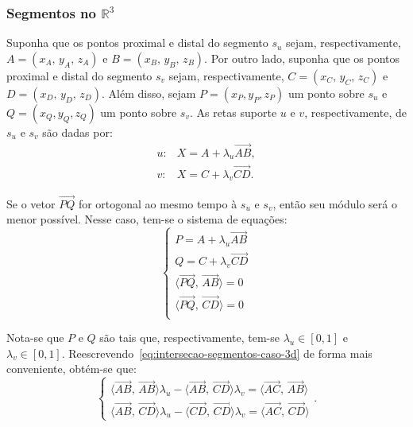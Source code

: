 \subsubsection{Segmentos no $\mathbb{R}^3$}\label{subsec:intersecao-3d}

Suponha que os pontos proximal e distal do segmento $s_u$ sejam, respectivamente, 
$A = (x_A,\, y_A,\, z_A)$ e $B = (x_B,\, y_B,\, z_B)$. 
Por outro lado, suponha que os pontos proximal e distal do segmento $s_v$ sejam, respectivamente, 
$C = (x_C,\, y_C,\, z_C)$ e $D = (x_D,\, y_D,\, z_D)$. Além disso, 
sejam $P = (x_P, y_P, z_P)$ um ponto sobre $s_u$ e 
$Q = (x_Q, y_Q, z_Q)$ um ponto sobre $s_v$. As retas suporte $u$ e $v$, 
respectivamente, de $s_u$ e $s_v$ são dadas por:
\begin{eqnarray}
  u: & X = A + \lambda_u\overrightarrow{AB}\label{eq:reta-suporte-do-segmento-su-3d}, \\
  v: & X = C + \lambda_v\overrightarrow{CD}\label{eq:reta-suporte-do-segmento-sv-3d}.
\end{eqnarray}

Se o vetor $\overrightarrow{PQ}$ for ortogonal ao mesmo tempo à $s_u$ e $s_v$, então seu módulo
será o menor possível. Nesse caso, tem-se o sistema de equações:
\begin{equation}
  \begin{cases}
    P = A + \lambda_u\overrightarrow{AB}\\
    Q = C + \lambda_v\overrightarrow{CD}\\
    \langle \overrightarrow{PQ}, \, \overrightarrow{AB}\rangle = 0\\
    \langle \overrightarrow{PQ}, \, \overrightarrow{CD}\rangle = 0\\
  \end{cases}
  \label{eq:intersecao-segmentos-caso-3d}
\end{equation}
 
Nota-se que $P$ e $Q$ são tais que, respectivamente, 
tem-se $\lambda_u\in[0, 1]$ e $\lambda_v\in[0, 1]$. Reescrevendo~\eqref{eq:intersecao-segmentos-caso-3d} de forma mais
conveniente, obtém-se que:
\begin{equation}
  \begin{cases}
    \langle \overrightarrow{AB}, \, \overrightarrow{AB}\rangle \lambda_u - \langle \overrightarrow{AB}, \, \overrightarrow{CD}\rangle\lambda_v = \langle \overrightarrow{AC}, \, \overrightarrow{AB}\rangle \\
    \langle \overrightarrow{AB}, \, \overrightarrow{CD}\rangle \lambda_u - \langle \overrightarrow{CD}, \, \overrightarrow{CD}\rangle\lambda_v = \langle \overrightarrow{AC}, \, \overrightarrow{CD}\rangle
  \end{cases}.
  \label{eq:sistema-intersecao-segmentos-caso-3d}
\end{equation}

